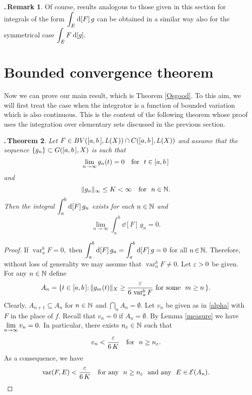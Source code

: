 \documentclass[12pt,twoside]{article}
\numberwithin{equation}{section}
\theoremstyle{plain}
\newtheorem{theorem}{\hskip-1mm.\,Theorem}[section]
\theoremstyle{definition}
\newtheorem{remark}[theorem]{\hskip-1mm.\,Remark}
\DeclareMathOperator{\var}{var}
\begin{document}
{\smallskip

\begin{remark}
Of course, results analogous to those given in this section for integrals of the form
\quad $\displaystyle\int_{E}\hskip0.2mm\mbox{\rm d}[F]\,g$ \quad can be obtained in a similar way also for the symmetrical
case \quad $\displaystyle\int_{E}F\,\hskip0.2mm\mbox{\rm d}[g].$
\end{remark}

\section{Bounded convergence theorem}

Now we can prove our main result, which is Theorem \ref{Osgood}. To this aim, we will
first treat the case when the integrator is a function of bounded variation which
is also continuous. This is the content of the following theorem whose proof uses
the integration over elementary sets discussed in the previous section.

\smallskip

\begin{theorem}\label{Osgood-cont}
Let $F\in BV([a,b\,],L(X))\cap C([a,b\,],L(X))$ and assume that the sequence $\{g_n\}\subset G([a,b\,],X)$
is such that
\[
   \lim_{n\to\infty}g_n(t)=0\quad \mbox{for \ } t\in[a,b\,]
\]
and
\[
   \|g_n\|_\infty\le K<\infty \quad\mbox{for \ } n\in{\mathbb N}.
\]
Then the integral $\displaystyle\int_a^b\hskip0.2mm\mbox{\rm d}[F]\,g_n$ exists for each $n\in{\mathbb N}$ and
\begin{equation}\label{lim-int}
   \lim_{n\to\infty}\int_a^b\dd[F]\,g_n=0.
\end{equation}
\end{theorem}
\begin{proof}
If $\var_a^bF=0,$ then $\displaystyle\int_a^b\hskip0.2mm\mbox{\rm d}[F]\,g_n=\int_a^b\hskip0.2mm\mbox{\rm d}[F]\,g=0$ for all $n\,{\in}\,{\mathbb N}.$
Therefore, without loss of generality we may assume that $\var_a^bF\ne 0.$ Let $\varepsilon>0$
be given. For any $n\in{\mathbb N}$ define
\[
   A_n=\{t\in\ab{:}\,\|g_m(t)\|_X\ge\frac{\eps}{6\,\var_a^bF}
       \mbox{\ for some \ } m\ge n\,\}.
\]
Clearly, $A_{n+1}\subseteq A_n$ for $n\in{\mathbb N}$ and $\bigcap_n A_n=\emptyset.$ Let $v_n$
be given as in \eqref{alpha} with $F$ in the place of $f.$ Recall that $v_n=0$ if
$A_n=\emptyset.$ By Lemma \ref{measure} we have  $\displaystyle\lim_{n\to\infty}v_n=0.$ In particular,
there exists $n_\varepsilon\in{\mathbb N}$ such that
\begin{equation}\label{r6.2}
   v_n<\frac{\eps}{6\,K}\quad \mbox{for \ } n\ge n_\eps.
\end{equation}
As a consequence, we have
\begin{equation}\label{r6.3}
   \var(F,E)<\frac{\eps}{6\,K}
   \quad\mbox{for any \ } n\ge n_\eps
        \mbox{ \ and any \ } E\in\mathcal{E}(A_n).
\end{equation}


\end{proof}}
\end{document}
